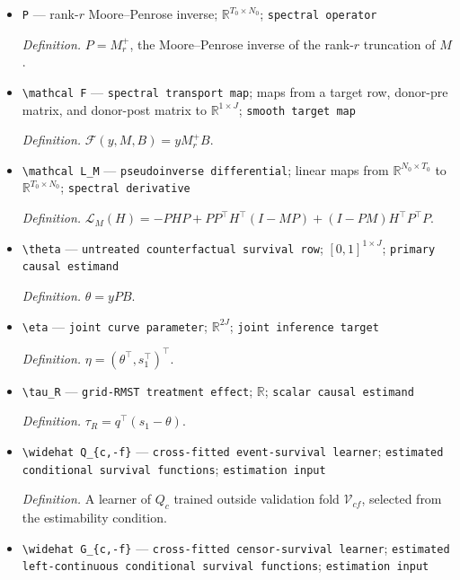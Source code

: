 \documentclass{article}
\begin{document}
\begin{itemize}
  \item \texttt{P} --- rank-\(r\) Moore--Penrose inverse; \(\mathbb R^{T_0\times N_0}\); \texttt{spectral operator}
  \par\smallskip\noindent\emph{Definition.} \(P=M_r^+\), the Moore--Penrose inverse of the rank-\(r\) truncation of \(M\).
  \item \texttt{\textbackslash{}\allowbreak{}mathcal F} --- \texttt{spectral transport map}; maps from a target row, donor-pre matrix, and donor-post matrix to \(\mathbb R^{1\times J}\); \texttt{smooth target map}
  \par\smallskip\noindent\emph{Definition.} \(\mathcal F(y,M,B)=yM_r^+B\).
  \item \texttt{\textbackslash{}\allowbreak{}mathcal L\_\allowbreak{}M} --- \texttt{pseudoinverse differential}; linear maps from \(\mathbb R^{N_0\times T_0}\) to \(\mathbb R^{T_0\times N_0}\); \texttt{spectral derivative}
  \par\smallskip\noindent\emph{Definition.} \(\mathcal L_M(H)=-PHP+PP^\top H^\top(I-MP)+(I-PM)H^\top P^\top P\).
  \item \texttt{\textbackslash{}\allowbreak{}theta} --- \texttt{untreated counterfactual survival row}; \([0,1]^{1\times J}\); \texttt{primary causal estimand}
  \par\smallskip\noindent\emph{Definition.} \(\theta=yPB\).
  \item \texttt{\textbackslash{}\allowbreak{}eta} --- \texttt{joint curve parameter}; \(\mathbb R^{2J}\); \texttt{joint inference target}
  \par\smallskip\noindent\emph{Definition.} \(\eta=(\theta^\top,s_1^\top)^\top\).
  \item \texttt{\textbackslash{}\allowbreak{}tau\_\allowbreak{}R} --- \texttt{grid-\allowbreak{}RMST treatment effect}; \(\mathbb R\); \texttt{scalar causal estimand}
  \par\smallskip\noindent\emph{Definition.} \(\tau_R=q^\top(s_1-\theta)\).
  \item \texttt{\textbackslash{}\allowbreak{}widehat Q\_\allowbreak{}\{c,\allowbreak{}-\allowbreak{}f\}\allowbreak{}} --- \texttt{cross-\allowbreak{}fitted event-\allowbreak{}survival learner}; \texttt{estimated conditional survival functions}; \texttt{estimation input}
  \par\smallskip\noindent\emph{Definition.} A learner of \(Q_c\) trained outside validation fold \(\mathcal V_{cf}\), selected from the estimability condition.
  \item \texttt{\textbackslash{}\allowbreak{}widehat G\_\allowbreak{}\{c,\allowbreak{}-\allowbreak{}f\}\allowbreak{}} --- \texttt{cross-\allowbreak{}fitted censor-\allowbreak{}survival learner}; \texttt{estimated left-\allowbreak{}continuous conditional survival functions}; \texttt{estimation input}

\end{itemize}
\end{document}
